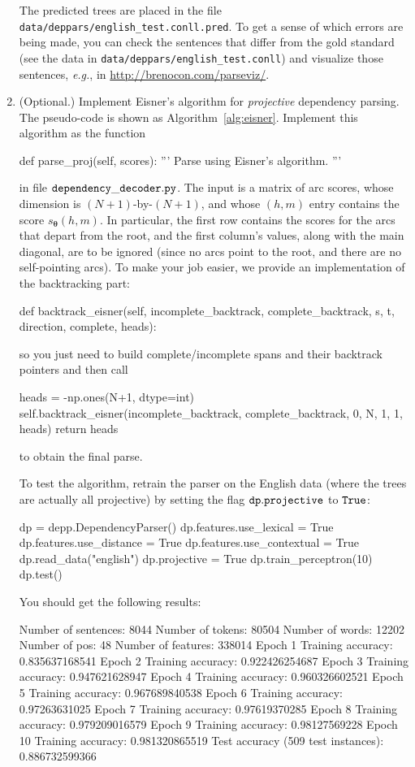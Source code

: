 \begin{exercise}
\begin{enumerate}
The predicted trees are placed in the file {\tt data/deppars/english\_test.conll.pred}. 
To get a sense of which errors are being made, you can 
check the sentences that differ from the gold standard (see the data in {\tt data/deppars/english\_test.conll}) 
and visualize those sentences, \emph{e.g.}, in 
\url{http://brenocon.com/parseviz/}. 

\item (Optional.) Implement Eisner's algorithm for \emph{projective} dependency parsing. 
The pseudo-code is shown as Algorithm~\ref{alg:eisner}. Implement this algorithm as the function

\begin{python}
    def parse_proj(self, scores):
        '''
        Parse using Eisner's algorithm.
        '''
\end{python}
in file ${\tt{dependency\_decoder.py}}$. The input is a matrix of arc scores, whose dimension is 
$(N+1)$-by-$(N+1)$, and whose $(h,m)$ entry contains the score $s_{\boldsymbol{\theta}}(h,m)$. 
In particular, the first row contains the scores for the arcs that depart from the root, 
and the first column's values, along with the main diagonal, are to be ignored (since no arcs 
point to the root, and there are no self-pointing arcs).
To make your job easier, we provide an implementation of the backtracking part:
\begin{python}
    def backtrack_eisner(self, incomplete_backtrack, complete_backtrack, s, t, direction, complete, heads):
\end{python}
so you just need to build complete/incomplete spans and their backtrack pointers and then call
\begin{python}
    heads = -np.ones(N+1, dtype=int)
    self.backtrack_eisner(incomplete_backtrack, complete_backtrack, 0, N, 1, 1, heads)
    return heads
\end{python}
to obtain the final parse.

To test the algorithm, retrain the parser on the English data (where the trees are actually all
projective) by setting the flag ${\tt{dp.projective}}$ to ${\tt{True}}$:
\begin{python}
dp = depp.DependencyParser()
dp.features.use_lexical = True
dp.features.use_distance = True
dp.features.use_contextual = True
dp.read_data("english")
dp.projective = True
dp.train_perceptron(10)
dp.test()
\end{python}

You should get the following results:
\begin{python}
Number of sentences: 8044
Number of tokens: 80504
Number of words: 12202
Number of pos: 48
Number of features: 338014
Epoch 1
Training accuracy: 0.835637168541
Epoch 2
Training accuracy: 0.922426254687
Epoch 3
Training accuracy: 0.947621628947
Epoch 4
Training accuracy: 0.960326602521
Epoch 5
Training accuracy: 0.967689840538
Epoch 6
Training accuracy: 0.97263631025
Epoch 7
Training accuracy: 0.97619370285
Epoch 8
Training accuracy: 0.979209016579
Epoch 9
Training accuracy: 0.98127569228
Epoch 10
Training accuracy: 0.981320865519
Test accuracy (509 test instances): 0.886732599366
\end{python}


\end{enumerate}
\end{exercise}
